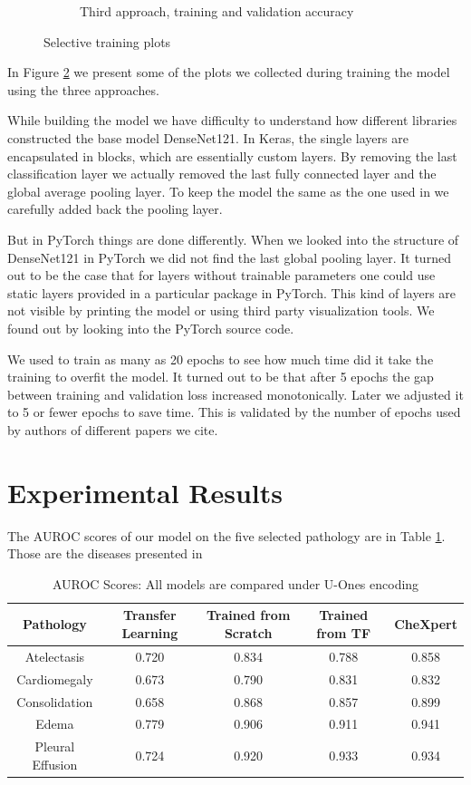 \documentclass{amia}
\begin{document}
\begin{figure}
\begin{subfigure}{0.33\linewidth}
	\caption{Third approach, training and validation accuracy}  \label{fig:c}
\end{subfigure}
\caption{Selective training plots}\label{train_plots}
\end{figure}

In Figure \ref{train_plots} we present some of the plots we collected during training the model using the three approaches.


While building the model we have difficulty to understand how different libraries constructed the base model DenseNet121. In Keras, the single layers are encapsulated in blocks, which are essentially custom layers. By removing the last classification layer we actually removed the last fully connected layer and the global average pooling layer. To keep the model the same as the one used in {\color{cyan}\cite{rajpurkar}} we carefully added back the pooling layer.


But in PyTorch things are done differently. When we looked into the structure of DenseNet121 in PyTorch we did not find the last global pooling layer. It turned out to be the case that for layers without trainable parameters one could use static layers provided in a particular package in PyTorch. This kind of layers are not visible by printing the model or using third party visualization tools. We found out by looking into the PyTorch source code.

We used to train as many as 20 epochs to see how much time did it take the training to overfit the model. It turned out to be that after 5 epochs the gap between training and validation loss increased monotonically. Later we adjusted it to 5 or fewer epochs to save time. This is validated by the number of epochs used by authors of different papers we cite.

\section{Experimental Results}

The AUROC scores of our model on the five selected pathology are in Table \ref{AUROC}. Those are the diseases presented in {\color{cyan}\cite{irvin}}


\begin{table}[th]
	\centering
	\begin{tabular}{ | c | c | c | c | c | }
		\hline
		Pathology & Transfer Learning & Trained from Scratch & Trained from TF & CheXpert \\
		\hline
		Atelectasis & 0.720 & 0.834 & 0.788 & 0.858 \\
		\hline
		Cardiomegaly & 0.673 & 0.790 & 0.831 & 0.832 \\
		\hline
		Consolidation & 0.658 & 0.868 & 0.857 & 0.899 \\
		\hline
		Edema & 0.779 & 0.906 & 0.911 & 0.941 \\
		\hline
		Pleural Effusion & 0.724 & 0.920 & 0.933 & 0.934 \\
		\hline
	\end{tabular}
	\caption{AUROC Scores: All models are compared under U-Ones encoding}\label{AUROC}
\end{table}
\end{document}
